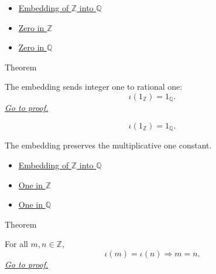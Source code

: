 \begin{dependencies}
\begin{itemize}
  \item \hyperref[def:rational-chapter-embedding-z-into-q]{Embedding of $\mathbb{Z}$ into $\mathbb{Q}$}
  \item \hyperref[def:zero-in-z]{Zero in $\mathbb{Z}$}
  \item \hyperref[def:zero-in-q]{Zero in $\mathbb{Q}$}
\end{itemize}
\end{dependencies}

\begin{theorembox}{Theorem}
\begin{theorem}
\label{thm:embedding-z-into-q-preserves-one}
The embedding sends integer one to rational one:
\[
\iota(1_{\mathbb{Z}})=1_{\mathbb{Q}}.
\]
\hyperref[prf:embedding-z-into-q-preserves-one]{\textit{Go to proof.}}
\end{theorem}
\end{theorembox}

\begin{remark*}
\[
\iota(1_{\mathbb{Z}})=1_{\mathbb{Q}}.
\]
\end{remark*}

\begin{remark*}[Interpretation]
The embedding preserves the multiplicative one constant.
\end{remark*}

\begin{dependencies}
\begin{itemize}
  \item \hyperref[def:rational-chapter-embedding-z-into-q]{Embedding of $\mathbb{Z}$ into $\mathbb{Q}$}
  \item \hyperref[def:one-in-z]{One in $\mathbb{Z}$}
  \item \hyperref[def:one-in-q]{One in $\mathbb{Q}$}
\end{itemize}
\end{dependencies}

\begin{theorembox}{Theorem}
\begin{theorem}
\label{thm:embedding-z-into-q-injective}
For all $m,n\in\mathbb{Z}$,
\[
\iota(m)=\iota(n)\Longrightarrow m=n.
\]
\hyperref[prf:embedding-z-into-q-injective]{\textit{Go to proof.}}
\end{theorem}
\end{theorembox}

